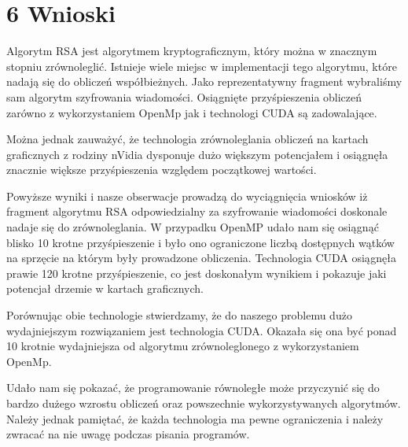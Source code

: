\documentclass[a4paper,12pt]{article}
\begin{document}
\clearpage
\section*{6 Wnioski}
Algorytm RSA jest algorytmem kryptograficznym, który można w znacznym stopniu zrównoleglić. Istnieje wiele miejsc w implementacji tego algorytmu, które nadają się do obliczeń współbieżnych. Jako reprezentatywny fragment wybraliśmy sam algorytm szyfrowania wiadomości. Osiągnięte przyśpieszenia obliczeń zarówno z wykorzystaniem OpenMp jak i technologi CUDA są zadowalające. 

Można jednak zauważyć, że technologia zrównoleglania obliczeń na kartach graficznych z rodziny nVidia dysponuje dużo większym potencjałem i osiągnęła znacznie większe przyśpieszenia względem początkowej wartości. 

Powyższe wyniki i nasze obserwacje prowadzą do wyciągnięcia wniosków iż fragment algorytmu RSA odpowiedzialny za szyfrowanie wiadomości doskonale nadaje się do zrównoleglania. W przypadku OpenMP udało nam się osiągnąć blisko 10 krotne przyśpieszenie i było ono ograniczone liczbą dostępnych wątków na sprzęcie na którym były prowadzone obliczenia. Technologia CUDA osiągnęła prawie 120 krotne przyśpieszenie, co jest doskonałym wynikiem i pokazuje jaki potencjał drzemie w kartach graficznych.

Porównując obie technologie stwierdzamy, że do naszego problemu dużo wydajniejszym rozwiązaniem jest technologia CUDA. Okazała się ona być ponad 10 krotnie wydajniejsza od algorytmu zrównoleglonego z wykorzystaniem OpenMp.

Udało nam się pokazać, że programowanie równoległe może przyczynić się do bardzo dużego wzrostu obliczeń oraz powszechnie wykorzystywanych algorytmów. Należy jednak pamiętać, że każda technologia ma pewne ograniczenia i należy zwracać na nie uwagę podczas pisania programów.
	
\end{document}
